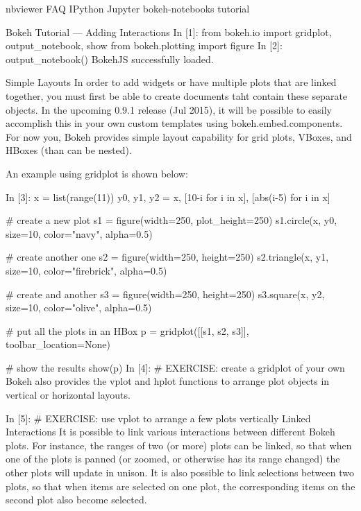 \documentclass[a4paper,12pt]{article}
\begin{document}
	\large
nbviewer
FAQ
IPython
Jupyter
bokeh-notebooks   tutorial
 	
Bokeh Tutorial — Adding Interactions
In [1]:
from bokeh.io import gridplot, output_notebook, show
from bokeh.plotting import figure
In [2]:
output_notebook()
BokehJS successfully loaded.


Simple Layouts
In order to add widgets or have multiple plots that are linked together, you must first be able to create documents taht contain these separate objects. In the upcoming 0.9.1 release (Jul 2015), it will be possible to easily accomplish this in your own custom templates using bokeh.embed.components. For now you, Bokeh provides simple layout capability for grid plots, VBoxes, and HBoxes (than can be nested).

An example using gridplot is shown below:

In [3]:
x = list(range(11))
y0, y1, y2 = x, [10-i for i in x], [abs(i-5) for i in x]

# create a new plot
s1 = figure(width=250, plot_height=250)
s1.circle(x, y0, size=10, color="navy", alpha=0.5)

# create another one
s2 = figure(width=250, height=250)
s2.triangle(x, y1, size=10, color="firebrick", alpha=0.5)

# create and another
s3 = figure(width=250, height=250)
s3.square(x, y2, size=10, color="olive", alpha=0.5)

# put all the plots in an HBox
p = gridplot([[s1, s2, s3]], toolbar_location=None)

# show the results
show(p)
In [4]:
# EXERCISE: create a gridplot of your own
Bokeh also provides the vplot and hplot functions to arrange plot objects in vertical or horizontal layouts.

In [5]:
# EXERCISE: use vplot to arrange a few plots vertically
Linked Interactions
It is possible to link various interactions between different Bokeh plots. For instance, the ranges of two (or more) plots can be linked, so that when one of the plots is panned (or zoomed, or otherwise has its range changed) the other plots will update in unison. It is also possible to link selections between two plots, so that when items are selected on one plot, the corresponding items on the second plot also become selected.

\end{document}
